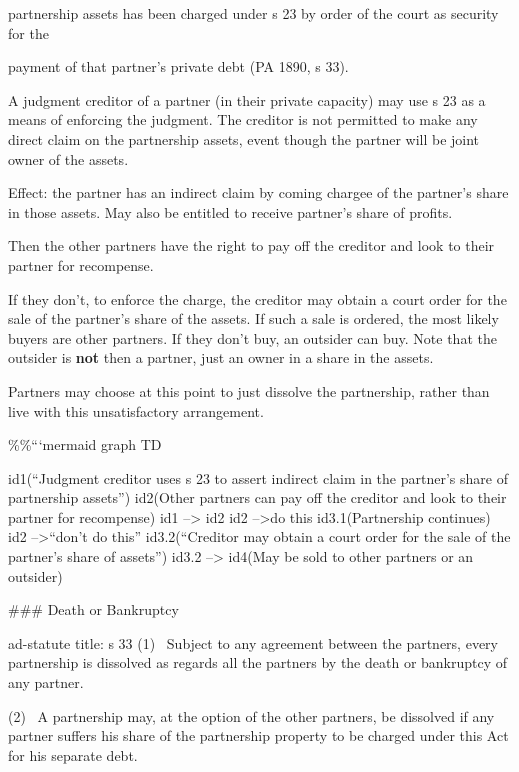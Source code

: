 \documentclass[
]{article}
\newenvironment{Shaded}{}{}
\newcommand{\NormalTok}[1]{#1}
\begin{document}
partnership assets has been charged under s 23 by order of the court as
security for the

payment of that partner's private debt (PA 1890, s 33).

A judgment creditor of a partner (in their private capacity) may use s
23 as a means of enforcing the judgment. The creditor is not permitted
to make any direct claim on the partnership assets, event though the
partner will be joint owner of the assets.

Effect: the partner has an indirect claim by coming chargee of the
partner's share in those assets. May also be entitled to receive
partner's share of profits.

Then the other partners have the right to pay off the creditor and look
to their partner for recompense.

If they don't, to enforce the charge, the creditor may obtain a court
order for the sale of the partner's share of the assets. If such a sale
is ordered, the most likely buyers are other partners. If they don't
buy, an outsider can buy. Note that the outsider is \textbf{not} then a
partner, just an owner in a share in the assets.

Partners may choose at this point to just dissolve the partnership,
rather than live with this unsatisfactory arrangement.

\%\%```mermaid graph TD

id1(``Judgment creditor uses s 23 to assert indirect claim in the
partner's share of partnership assets'') id2(Other partners can pay off
the creditor and look to their partner for recompense) id1
--\textgreater{} id2 id2 --\textgreater\textbar do this\textbar{}
id3.1(Partnership continues) id2 --\textgreater\textbar{}``don't do
this''\textbar{} id3.2(``Creditor may obtain a court order for the sale
of the partner's share of assets'') id3.2 --\textgreater{} id4(May be
sold to other partners or an outsider)

\begin{Shaded}
\begin{Highlighting}[]

\NormalTok{\#\#\# Death or Bankruptcy}

\NormalTok{\textasciigrave{}\textasciigrave{}\textasciigrave{}ad{-}statute}
\NormalTok{title: s 33}
\NormalTok{(1)  Subject to any agreement between the partners, every partnership is dissolved as regards all the partners by the death or bankruptcy of any partner.}

\NormalTok{(2)  A partnership may, at the option of the other partners, be dissolved if any partner suffers his share of the partnership property to be charged under this Act for his separate debt.}
\end{Highlighting}
\end{Shaded}
\end{document}
